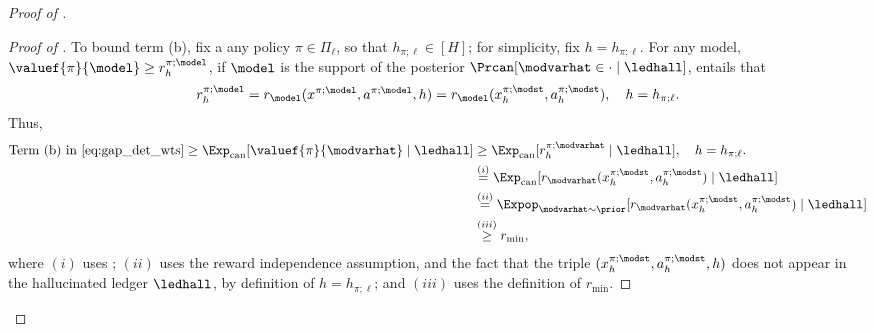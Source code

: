 \begin{proof}[Proof of ]
\begin{proof}[Proof of ]
To bound term (b), fix a any policy $\pi \in \Pi_{\ell}$, so that $h_{\pi;\ell} \in [H]$; for simplicity, fix $ h = h_{\pi;\ell}$. For any model, $\valuef{\pi}{\model} \ge r^{\pi;\model}_{h}$, if $\model$ is the support of the posterior $\Prcan[\modvarhat  \in \cdot \mid \ledhall]$,  entails that
\begin{align}
r^{\pi;\model}_{h} = r_{\model}(x^{\pi;\model},a^{\pi;\model},h) = r_{\model}(x^{\pi;\modst}_h,a_h^{\pi;\modst}), \quad   h = h_{\pi;\ell}. \label{eq:rpi_id}
\end{align}
Thus,
\begin{align*}
\text{Term (b) in \Cref{eq:gap_det_wts}} \ge \Expcan[\valuef{\pi}{\modvarhat} \mid \ledhall] &\ge \Expcan[r^{\pi;\modvarhat}_{h} \mid \ledhall], \quad   h = h_{\pi;\ell}. \\
&\overset{(i)}{=} \Expcan[r_{\modvarhat}(x^{\pi;\modst}_h,a_h^{\pi;\modst}) \mid  \ledhall]\\
&\overset{(ii)}{=} \Expop_{\modvarhat \sim \prior}[r_{\modvarhat}(x^{\pi;\modst}_h,a_h^{\pi;\modst}) \mid  \ledhall]\\
&\overset{(iii)}{\ge} r_{\min},
\end{align*}
where $(i)$ uses ; $(ii)$ uses the reward independence assumption, and the fact that  the triple $(x^{\pi;\modst}_h,a_h^{\pi;\modst},h)$ does not appear in the hallucinated ledger $\ledhall$, by definition of $h = h_{\pi;\ell}$; and $(iii)$ uses the definition of $r_{\min}$.
\end{proof}



\end{proof}
